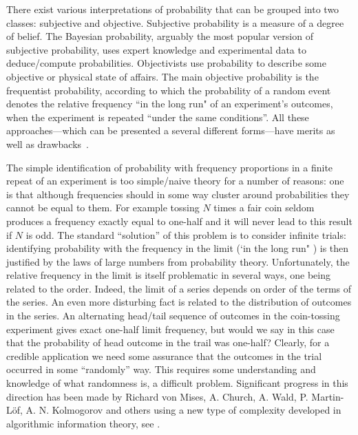 \documentclass[11pt]{article}
\begin{document}
There exist various  interpretations of probability that can be grouped into two classes:  subjective and objective. Subjective probability is a measure of  a degree of belief.
The Bayesian probability, arguably the most popular version of subjective probability,
uses expert knowledge and experimental data to deduce/compute probabilities.
Objectivists use probability to describe some objective or physical state of affairs. The main objective probability is
the frequentist probability, according to which  the probability of a random event denotes the relative frequency ``in the long run"  of  an experiment's outcomes, when the experiment is repeated ``under the same conditions''.
 All these approaches---which can be presented a several different forms---have merits as well as drawbacks~\cite{Sklar-1993}.


The simple identification of probability with frequency proportions in a finite repeat of an experiment is too simple/naive theory for a number of reasons: one is that although frequencies should in some way cluster around probabilities they cannot be equal to them. For example tossing $N$ times a fair coin  seldom produces a frequency exactly equal to one-half and it will never lead to this result if $N$ is odd. The standard ``solution'' of this problem is to consider
infinite trials:  identifying probability with the frequency in the limit (`in the long run" ) is then justified by the laws of large numbers from probability theory. Unfortunately, the  relative frequency in the limit is itself problematic in several ways, one being related to the order. Indeed, the limit of a series depends on order of the terms of the series. An even more disturbing fact is related to the distribution of outcomes in the series. An alternating head/tail
sequence of outcomes in the coin-tossing experiment gives exact one-half limit frequency, but would we say in this case that the probability of head outcome in the trail was one-half? Clearly, for a credible application we need some assurance that the outcomes in the trial occurred in some ``randomly'' way. This requires some understanding and knowledge of what randomness is, a difficult problem.  Significant progress in this direction has been made by Richard von Mises, A. Church, A. Wald, P. Martin-L\"of, A. N. Kolmogorov and others using a new type of complexity developed in algorithmic information theory, see \cite{calude:02,DH}.
\end{document}
